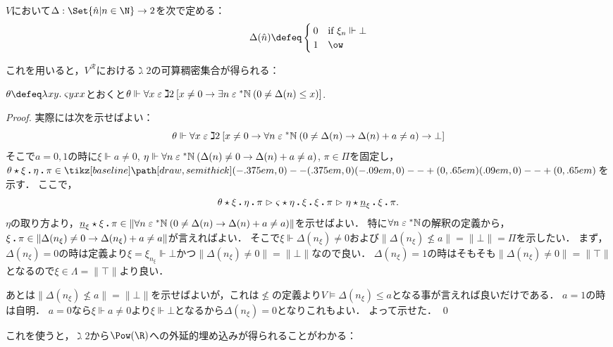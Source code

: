 \documentclass[realisability.tex]{subfiles}
\begin{document}
\begin{definition}[可算実現可能性代数の特性関数]
 $V$において$\Delta: \Set{ \hat{n} | n \in \N } \to 2$を次で定める：
 \[
  \Delta(\hat{n}) \defeq
  \begin{cases}
   0 & \text{if } \xi_n \Vdash \bot\\
   1 & \ow
  \end{cases}
 \]
\end{definition}
これを用いると，$V^{\mathcal{R}}$における$\gimel 2$の可算稠密集合が得られる：
\begin{lemma}
 $\theta \defeq \abs{xy}{\varsigma y x x}$とおくと$\theta \Vdash \forall x \mathrel{\varepsilon} \gimel 2\:[x \neq 0 \to \exists n \mathrel{\varepsilon} \mathord{{}^{*}\mathbb{N}}\:(0 \neq \Delta(n) \leq x)]$.
\end{lemma}
\begin{proof}
 実際には次を示せばよい：
 \[
  \theta \Vdash \forall x \mathrel{\varepsilon} \gimel 2\:[x \neq 0 \to \forall n \mathrel{\varepsilon} \mathord{{}^{*}\mathbb{N}}\:(0 \neq \Delta(n) \to \Delta(n) + a \neq a) \to \bot]
 \]
 そこで$a = 0, 1$の時に$\xi \Vdash a \neq 0$, $\eta \Vdash \forall n \mathrel{\varepsilon} \mathord{{}^{*}\mathbb{N}}\:(\Delta(n) \neq 0 \to \Delta(n) + a \neq a)$, $\pi \in \Pi$を固定し，$\KVM{{\theta}{\xi}{\eta}{\pi}} \in \pole$を示す．
 ここで，
 \[
  \KVM{{\theta}{\xi}{\eta}{\pi}}
 \reds \KVM{{\varsigma}{\eta}{\xi}{\xi}{\pi}}
 \reds \KVM{\eta {{\num{n}_\xi}} \xi \pi}.
 \]
 $\eta$の取り方より，$\KVM{{{\num{n}_\xi}} \xi \pi} \in \|\forall n \strin \NN\: (0 \neq \Delta(n) \to \Delta(n) + a \neq a) \|$を示せばよい．
 特に$\forall n \mathrel{\varepsilon} \mathord{{}^{*}\mathbb{N}}$の解釈の定義から，$\xi \mathbin{\boldsymbol{.}} \pi \in \|\Delta(n_\xi) \neq 0 \to \Delta(n_\xi) + a \neq a\|$が言えればよい．
 そこで$\xi \Vdash \Delta(n_\xi) \neq 0$および$\|\Delta(n_\xi) \nleq a\| = \|\bot\| = \Pi$を示したい．
 まず，$\Delta(n_\xi) = 0$の時は定義より$\xi = \xi_{n_\xi} \Vdash \bot$かつ$\|\Delta(n_\xi) \neq 0\| = \|\bot\|$なので良い．
 $\Delta(n_\xi) = 1$の時はそもそも$\|\Delta(n_\xi) \neq 0\| = \|\top\|$となるので$\xi \in \Lambda = \|\top\|$より良い．

 あとは$\|\Delta(n_\xi) \nleq a\| = \|\bot\|$を示せばよいが，これは$\nleq$の定義より$V \models \Delta(n_\xi) \leq a$となる事が言えれば良いだけである．
 $a = 1$の時は自明．
 $a = 0$なら$\xi \Vdash a \neq 0$より$\xi \Vdash \bot$となるから$\Delta(n_\xi) = 0$となりこれもよい．
 よって示せた． \qed
\end{proof}

これを使うと，$\gimel 2$から$\Pow(\R)$への外延的埋め込みが得られることがわかる：
\end{document}
